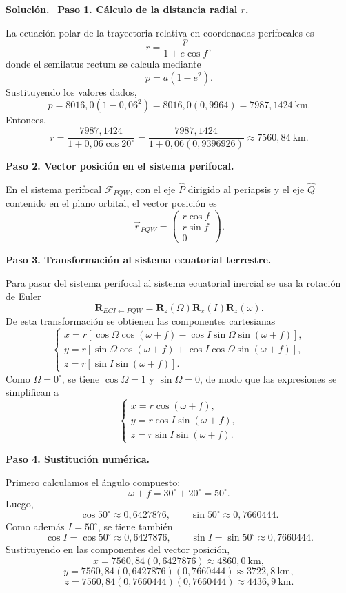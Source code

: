 \documentclass[11pt]{article}
\theoremstyle{prismstyle}
\newenvironment{solution}[1][Solución]
  {\par\textbf{#1.}\ }
  {\par}
\begin{document}
\begin{solution}
\textbf{Paso 1. Cálculo de la distancia radial $r$.}

La ecuación polar de la trayectoria relativa en coordenadas perifocales es
\[
r = \frac{p}{1+e\cos f},
\]
donde el semilatus rectum se calcula mediante
\[
p = a(1-e^2).
\]
Sustituyendo los valores dados,
\[
p = 8016{,}0(1-0{,}06^2) = 8016{,}0(0{,}9964) = 7987{,}1424\ \text{km}.
\]
Entonces,
\[
r = \frac{7987{,}1424}{1+0{,}06\cos 20^\circ}
= \frac{7987{,}1424}{1+0{,}06(0{,}9396926)}
\approx 7560{,}84\ \text{km}.
\]

\textbf{Paso 2. Vector posición en el sistema perifocal.}

En el sistema perifocal $\mathcal{F}_{PQW}$, con el eje $\hat{P}$ dirigido al periapsis y el eje $\hat{Q}$ contenido en el plano orbital, el vector posición es
\[
\vec{r}_{PQW} =
\begin{pmatrix}
r\cos f \\
r\sin f \\
0
\end{pmatrix}.
\]

\textbf{Paso 3. Transformación al sistema ecuatorial terrestre.}

Para pasar del sistema perifocal al sistema ecuatorial inercial se usa la rotación de Euler
\[
\mathbf{R}_{ECI \leftarrow PQW} = \mathbf{R}_z(\Omega)\mathbf{R}_x(I)\mathbf{R}_z(\omega).
\]
De esta transformación se obtienen las componentes cartesianas
\[
\begin{cases}
x = r\left[\cos\Omega\cos(\omega+f) - \cos I\sin\Omega\sin(\omega+f)\right], \\
y = r\left[\sin\Omega\cos(\omega+f) + \cos I\cos\Omega\sin(\omega+f)\right], \\
z = r\left[\sin I\sin(\omega+f)\right].
\end{cases}
\]
Como $\Omega=0^\circ$, se tiene $\cos\Omega=1$ y $\sin\Omega=0$, de modo que las expresiones se simplifican a
\[
\begin{cases}
x = r\cos(\omega+f), \\
y = r\cos I\sin(\omega+f), \\
z = r\sin I\sin(\omega+f).
\end{cases}
\]

\textbf{Paso 4. Sustitución numérica.}

Primero calculamos el ángulo compuesto:
\[
\omega+f = 30^\circ + 20^\circ = 50^\circ.
\]
Luego,
\[
\cos 50^\circ \approx 0{,}6427876,
\qquad
\sin 50^\circ \approx 0{,}7660444.
\]
Como además $I=50^\circ$, se tiene también
\[
\cos I = \cos 50^\circ \approx 0{,}6427876,
\qquad
\sin I = \sin 50^\circ \approx 0{,}7660444.
\]
Sustituyendo en las componentes del vector posición,
\[
x = 7560{,}84(0{,}6427876) \approx 4860{,}0\ \text{km},
\]
\[
y = 7560{,}84(0{,}6427876)(0{,}7660444) \approx 3722{,}8\ \text{km},
\]
\[
z = 7560{,}84(0{,}7660444)(0{,}7660444) \approx 4436{,}9\ \text{km}.
\]


\end{solution}
\end{document}
